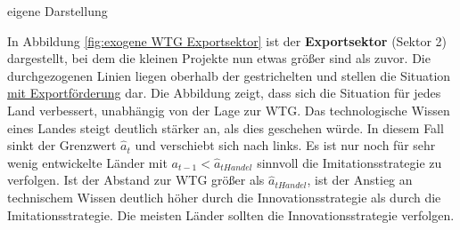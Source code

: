 	\begin{figure*}[htb]
		\hfill{}  eigene Darstellung
		\caption{exogene WTG im Exportsektor}
		\label{fig:exogene WTG Exportsektor}
	\end{figure*}
%	
In Abbildung \ref{fig:exogene WTG Exportsektor} ist der \textbf{Exportsektor} (Sektor 2) dargestellt, bei dem die kleinen Projekte nun etwas größer sind als zuvor. Die durchgezogenen Linien liegen oberhalb der gestrichelten und stellen die Situation \underline{mit Exportförderung} dar. Die Abbildung zeigt, dass sich die Situation für jedes Land verbessert, unabhängig von der Lage zur WTG. Das technologische Wissen eines Landes steigt deutlich stärker an, als dies  geschehen würde. In diesem Fall sinkt der Grenzwert $\hat{a}_t$ und verschiebt sich nach links. Es ist nur noch für sehr wenig entwickelte Länder mit $a_{t-1}<\hat{a}_{tHandel}$ sinnvoll die \textcolor[rgb]{0,0.32,0}{Imitationsstrategie} zu verfolgen. Ist der Abstand zur WTG größer als $\hat{a}_{tHandel}$, ist der Anstieg an technischem Wissen deutlich höher durch die \textcolor[rgb]{0.74,0.97,0.22}{Innovationsstrategie} als durch die \textcolor[rgb]{0,0.32,0}{Imitationsstrategie}. Die meisten Länder sollten die \textcolor[rgb]{0.74,0.97,0.22}{Innovationsstrategie} verfolgen.\\


